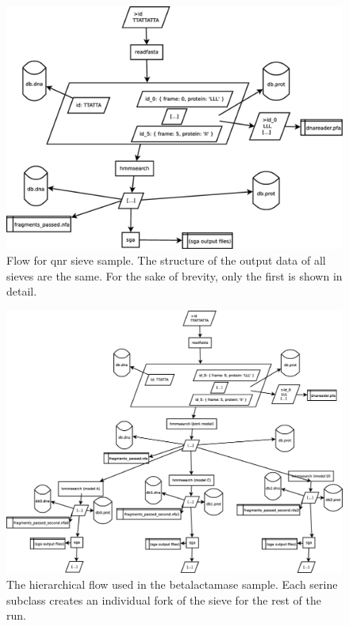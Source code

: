 \documentclass[a4paper,12pt]{article}
\begin{document}
\begin{figure}[h]
\includegraphics[width=\textwidth, keepaspectratio=true]{flow}
\caption{Flow for qnr sieve sample. The structure of the output data of all sieves are the same. For the sake of brevity, only the first is shown in detail.}
\label{fig:qnrflow}
\end{figure}

\begin{figure}[h]
\includegraphics[width=\textwidth, keepaspectratio=true]{blflow}
\caption{The hierarchical flow used in the betalactamase sample. Each serine subclass creates an individual fork of the sieve for the rest of the run.}
\label{fig:qnrflow}
\end{figure}
\end{document}
